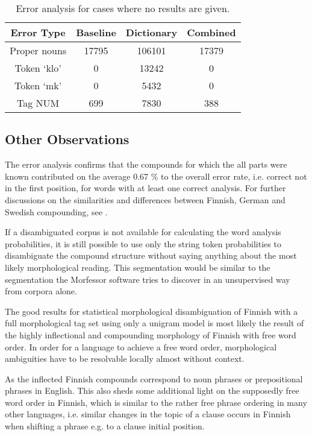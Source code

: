 \documentclass[a4paper]{article}
\begin{document}
\begin{table}[h!]
  \centering
  \caption{Error analysis for cases where no results are given.
  }\label{tab:incorrect1}
  \begin{scriptsize}
    \begin{tabular}{c|c|c|c}
      \hline
      Error Type & Baseline & Dictionary & Combined \\
      \hline
	  Proper nouns & 17795 & 106101 & 17379 \\
	  \hline
	  Token `klo' & 0 & 13242 & 0 \\
	  Token `mk' & 0 & 5432 & 0 \\
	  \hline
	  Tag NUM & 699 & 7830 & 388 \\
	  \hline 
    \end{tabular}
  \end{scriptsize}
\end{table}

\subsection{Other Observations}

The error analysis confirms that the compounds for which the all parts
were known contributed on the average 0.67 \% to the overall error
rate, i.e. correct not in the first position, for words with at least
one correct analysis. For further discussions on the similarities and
differences between Finnish, German and Swedish compounding, see
\cite{linden09nodalida}.

If a disambiguated corpus is not available for calculating the word
analysis probabilities, it is still possible to use only the string
token probabilities to disambiguate the compound structure without
saying anything about the most likely morphological reading. This
segmentation would be similar to the segmentation the Morfessor
software \cite{creutz2005} tries to discover in an unsupervised way
from corpora alone.

The good results for statistical morphological disambiguation of
Finnish with a full morphological tag set using only a unigram model
is most likely the result of the highly inflectional and compounding
morphology of Finnish with free word order. In order for a language to
achieve a free word order, morphological ambiguities have to be
resolvable locally almost without context. 

As the inflected Finnish compounds correspond to noun phrases or
prepositional phrases in English. This also sheds some additional
light on the supposedly free word order in Finnish, which is similar
to the rather free phrase ordering in many other languages,
i.e. similar changes in the topic of a clause occurs in Finnish when
shifting a phrase e.g. to a clause initial position.
\end{document}

